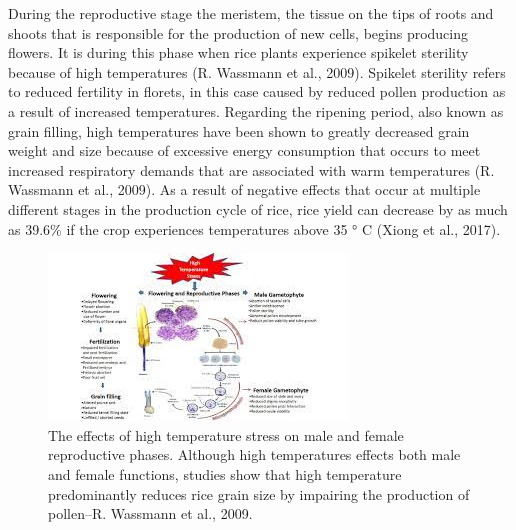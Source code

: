 \documentclass{book}\usepackage{knitr}
\begin{document}
 During the reproductive stage the meristem, the tissue on the tips of roots and shoots that is responsible for the production of new cells, begins producing flowers. It is during this phase when rice plants experience spikelet sterility because of high temperatures (R. Wassmann et al., 2009). Spikelet sterility refers to reduced fertility in florets, in this case caused by reduced pollen production as a result of increased temperatures. Regarding the ripening period, also known as grain filling, high temperatures have been shown to greatly decreased grain weight and size because of excessive energy consumption that occurs to meet increased respiratory demands that are associated with warm temperatures (R. Wassmann et al., 2009). As a result of negative effects that occur at multiple different stages in the production cycle of rice, rice yield can decrease by as much as 39.6\% if the crop experiences temperatures above 35 ° C (Xiong et al., 2017).
 
\begin{figure}
\includegraphics[width=\linewidth]{images/myanmar/Image5.jpg}
\caption{The effects of high temperature stress on male and female reproductive phases. Although high temperatures effects both male and female functions, studies show that high temperature predominantly reduces rice grain size by impairing the production of pollen--R. Wassmann et al., 2009.}
\end{figure}
\end{document}
